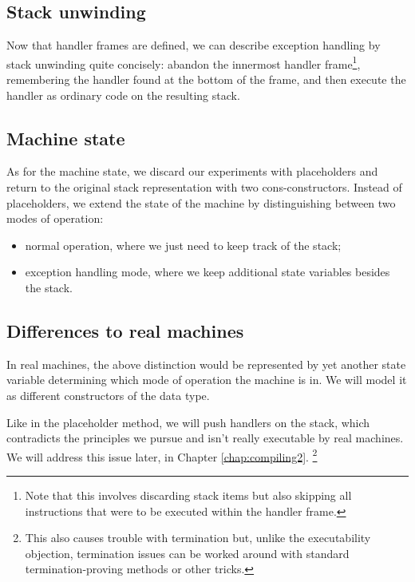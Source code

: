 
\subsection{Stack unwinding}
Now that handler frames are defined, we can describe exception handling
by stack unwinding quite concisely: abandon the innermost handler frame\footnote{%
Note that this involves discarding stack items but also skipping all instructions
that were to be executed within the handler frame.},
remembering the handler found at the bottom of the frame, and then
execute the handler as ordinary code on the resulting stack.

\subsection{Machine state}

As for the machine state, we discard our experiments with placeholders and return
to the original stack representation with two cons-constructors.
Instead of placeholders, we extend the state of the machine by distinguishing between
two modes of operation:
\begin{itemize}
	\item normal operation, where we just need to keep track of the stack;
	\item exception handling mode, where we keep additional state variables besides the stack.
\end{itemize}

\subsection{Differences to real machines}

In real machines, the above distinction would be represented by yet another
state variable determining which mode of operation the machine is in.
We will model it as different constructors of the  data type.

Like in the placeholder method, we will push handlers on the stack, which
contradicts the principles we pursue and isn't really executable by real
machines. We will address this issue later, in Chapter \ref{chap:compiling2}.%
\footnote{This also causes trouble with termination but, unlike the
executability objection, termination issues can be worked around with
standard termination-proving methods or other tricks.}

